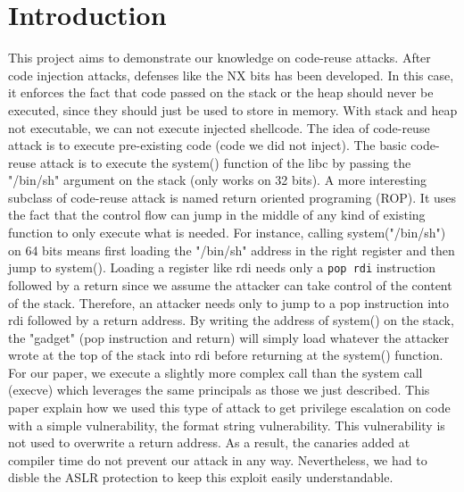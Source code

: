 \section{Introduction}
This project aims to demonstrate our knowledge on code-reuse attacks. After code injection attacks, defenses like the NX bits has been developed. In this case, it enforces the fact that code passed on the stack or the heap should never be executed, since they should just be used to store in memory. With stack and heap not executable, we can not execute injected shellcode. The idea of code-reuse attack is to execute pre-existing code (code we did not inject). The basic code-reuse attack is to execute the system() function of the libc by passing the "/bin/sh" argument on the stack (only works on 32 bits). A more interesting subclass of code-reuse attack is named return oriented programing (ROP). It uses the fact that the control flow can jump in the middle of any kind of existing function to only execute what is needed. For instance, calling system("/bin/sh") on 64 bits means first loading the "/bin/sh" address in the right register and then jump to system(). Loading a register like rdi needs only a {\tt pop rdi} instruction followed by a return since we assume the attacker can take control of the content of the stack. Therefore, an attacker needs only to jump to a pop instruction into rdi followed by a return address. By writing the address of system() on the stack, the "gadget" (pop instruction and return) will simply load whatever the attacker wrote at the top of the stack into rdi before returning at the system() function. For our paper, we execute a slightly more complex call than the system call (execve) which leverages the same principals as those we just described. This paper explain how we used this type of attack to get privilege escalation on code with a simple vulnerability, the format string vulnerability. This vulnerability is not used to overwrite a return address. As a result, the canaries added at compiler time do not prevent our attack in any way. Nevertheless, we had to disble the ASLR protection to keep this exploit easily understandable.

